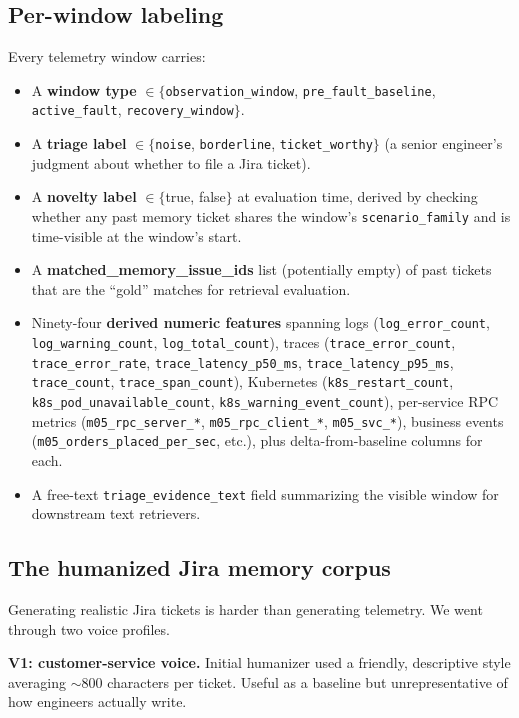 \subsection{Per-window labeling}

Every telemetry window carries:

\begin{itemize}
\item A \textbf{window type} $\in \{$\texttt{observation\_window}, \texttt{pre\_fault\_baseline}, \texttt{active\_fault}, \texttt{recovery\_window}$\}$.
\item A \textbf{triage label} $\in \{$\texttt{noise}, \texttt{borderline}, \texttt{ticket\_worthy}$\}$ (a senior engineer's judgment about whether to file a Jira ticket).
\item A \textbf{novelty label} $\in \{$true, false$\}$ at evaluation time, derived by checking whether any past memory ticket shares the window's \texttt{scenario\_family} and is time-visible at the window's start.
\item A \textbf{matched\_memory\_issue\_ids} list (potentially empty) of past tickets that are the ``gold'' matches for retrieval evaluation.
\item Ninety-four \textbf{derived numeric features} spanning logs (\texttt{log\_error\_count}, \texttt{log\_warning\_count}, \texttt{log\_total\_count}), traces (\texttt{trace\_error\_count}, \texttt{trace\_error\_rate}, \texttt{trace\_latency\_p50\_ms}, \texttt{trace\_latency\_p95\_ms}, \texttt{trace\_count}, \texttt{trace\_span\_count}), Kubernetes (\texttt{k8s\_restart\_count}, \texttt{k8s\_pod\_unavailable\_count}, \texttt{k8s\_warning\_event\_count}), per-service RPC metrics (\texttt{m05\_rpc\_server\_*}, \texttt{m05\_rpc\_client\_*}, \texttt{m05\_svc\_*}), business events (\texttt{m05\_orders\_placed\_per\_sec}, etc.), plus delta-from-baseline columns for each.
\item A free-text \texttt{triage\_evidence\_text} field summarizing the visible window for downstream text retrievers.
\end{itemize}

\subsection{The humanized Jira memory corpus}

Generating realistic Jira tickets is harder than generating telemetry. We went through two voice profiles.

\textbf{V1: customer-service voice.} Initial humanizer used a friendly, descriptive style averaging $\sim$800 characters per ticket. Useful as a baseline but unrepresentative of how engineers actually write.

